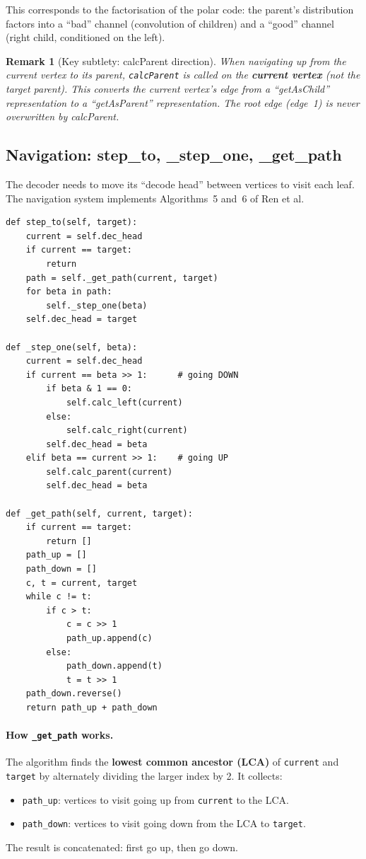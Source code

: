 \documentclass[11pt,a4paper]{article}
\newtheorem{remark}{Remark}[section]
\begin{document}
This corresponds to the factorisation of the polar code: the parent's distribution factors into a ``bad'' channel (convolution of children) and a ``good'' channel (right child, conditioned on the left).

\begin{remark}[Key subtlety: calcParent direction]
When navigating \emph{up} from the current vertex to its parent, \texttt{calcParent} is called on the \textbf{current vertex} (not the target parent). This converts the current vertex's edge from a ``getAsChild'' representation to a ``getAsParent'' representation. The root edge (edge~1) is never overwritten by calcParent.
\end{remark}

\subsection{Navigation: step\_to, \_step\_one, \_get\_path}
\label{subsec:navigation}

The decoder needs to move its ``decode head'' between vertices to visit each leaf. The navigation system implements Algorithms~5 and~6 of Ren et al.

\begin{lstlisting}[caption={Navigation (\texttt{step\_to}, \texttt{\_step\_one}, \texttt{\_get\_path})}]
def step_to(self, target):
    current = self.dec_head
    if current == target:
        return
    path = self._get_path(current, target)
    for beta in path:
        self._step_one(beta)
    self.dec_head = target

def _step_one(self, beta):
    current = self.dec_head
    if current == beta >> 1:      # going DOWN
        if beta & 1 == 0:
            self.calc_left(current)
        else:
            self.calc_right(current)
        self.dec_head = beta
    elif beta == current >> 1:    # going UP
        self.calc_parent(current)
        self.dec_head = beta

def _get_path(self, current, target):
    if current == target:
        return []
    path_up = []
    path_down = []
    c, t = current, target
    while c != t:
        if c > t:
            c = c >> 1
            path_up.append(c)
        else:
            path_down.append(t)
            t = t >> 1
    path_down.reverse()
    return path_up + path_down
\end{lstlisting}

\paragraph{How \texttt{\_get\_path} works.}
The algorithm finds the \textbf{lowest common ancestor (LCA)} of \texttt{current} and \texttt{target} by alternately dividing the larger index by 2. It collects:
\begin{itemize}
    \item \texttt{path\_up}: vertices to visit going up from \texttt{current} to the LCA.
    \item \texttt{path\_down}: vertices to visit going down from the LCA to \texttt{target}.
\end{itemize}
The result is concatenated: first go up, then go down.
\end{document}
